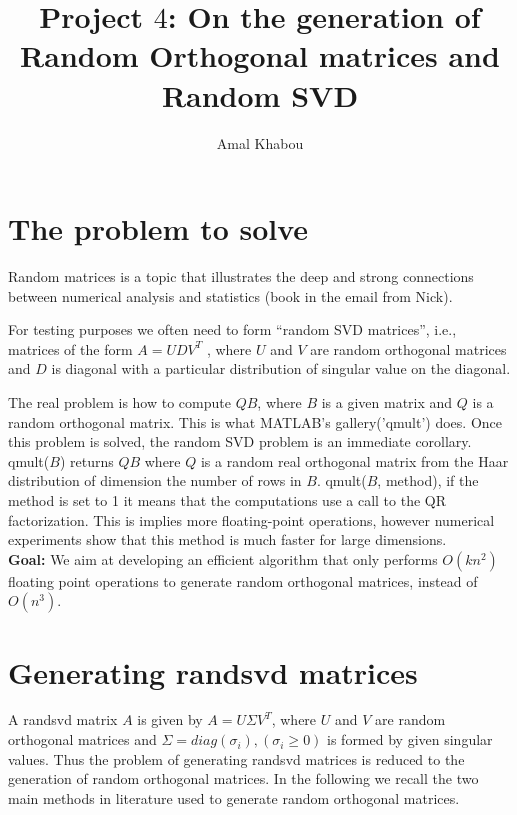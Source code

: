 \documentclass[a4paper]{article}
\title{Project $4$: On the generation of Random Orthogonal matrices and Random SVD}
\author{Amal Khabou }
\begin{document}
 

\maketitle

\section{The problem to solve} 

Random matrices is a topic that illustrates the deep and strong connections between numerical analysis and statistics 
\cite{} (book in the email from Nick).

For testing purposes we often need to form ``random SVD matrices'', i.e., matrices of the form $A = UDV^T$ , 
where $U$ and $V$ are random orthogonal matrices and $D$ is diagonal with a 
particular distribution of singular value on the diagonal.


The real problem is how to compute $QB$, where $B$ is a given matrix and $Q$ 
is a random orthogonal matrix. This is what MATLAB's gallery('qmult') does. 
Once this problem is solved, the random SVD problem is an immediate corollary.
qmult($B$) returns $QB$ where $Q$ is a random real orthogonal matrix from the 
Haar distribution of dimension the number of rows in $B$. 
qmult($B$, method), if the method is set to 1 it means that the computations 
use a call to the QR factorization. This is implies more floating-point operations, 
however numerical experiments show that this method is much faster for large dimensions.\\

\textbf{Goal:} We aim at developing an efficient algorithm that only performs 
$O(kn^2)$ floating point operations to generate random orthogonal matrices, instead of $O(n^3)$.


\section{Generating randsvd matrices}
A randsvd matrix $A$ is given by $A = U \Sigma V^T$, where $U$ and $V$ are random orthogonal matrices and 
$ \Sigma = diag(\sigma_i), (\sigma_i \geq 0)$ is formed by given singular values. Thus the problem of 
generating randsvd matrices is reduced to the generation of random orthogonal matrices. In the following 
we recall the two main methods in literature used to generate random orthogonal matrices.\\
\end{document}
